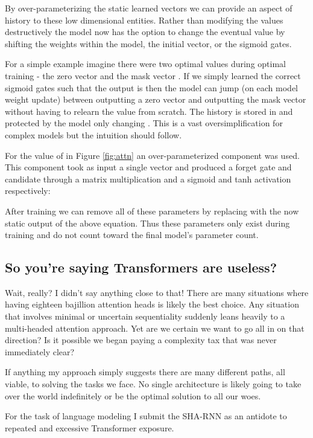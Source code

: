\documentclass{article}
\begin{document}
By over-parameterizing the static learned vectors we can provide an aspect of history to these low dimensional entities.
Rather than modifying the values destructively the model now has the option to change the eventual value by shifting the weights within the model, the initial vector, or the sigmoid gates.

For a simple example imagine there were two optimal values during optimal training - the zero vector  and the mask vector .
If we simply learned the correct sigmoid gates  such that the output is  then the model can jump (on each model weight update) between outputting a zero vector and outputting the mask vector  without having to relearn the value from scratch.
The history is stored in  and protected by the model only changing .
This is a vast oversimplification for complex models but the intuition should follow.

For the value of  in Figure \ref{fig:attn} an over-parameterized component was used.
This component took as input a single vector  and produced a forget gate  and candidate  through a matrix multiplication and a sigmoid and tanh activation respectively:

After training we can remove all of these parameters by replacing  with the now static output of the above equation.
Thus these parameters only exist during training and do not count toward the final model's parameter count.







\subsection{So you're saying Transformers are useless?}

Wait, really?
I didn't say anything close to that!
There are many situations where having eighteen bajillion attention heads is likely the best choice.
Any situation that involves minimal or uncertain sequentiality suddenly leans heavily to a multi-headed attention approach.
Yet are we certain we want to go all in on that direction?
Is it possible we began paying a complexity tax that was never immediately clear?

If anything my approach simply suggests there are many different paths, all viable, to solving the tasks we face.
No single architecture is likely going to take over the world indefinitely or be the optimal solution to all our woes.

For the task of language modeling I submit the SHA-RNN as an antidote to repeated and excessive Transformer exposure.
\end{document}
